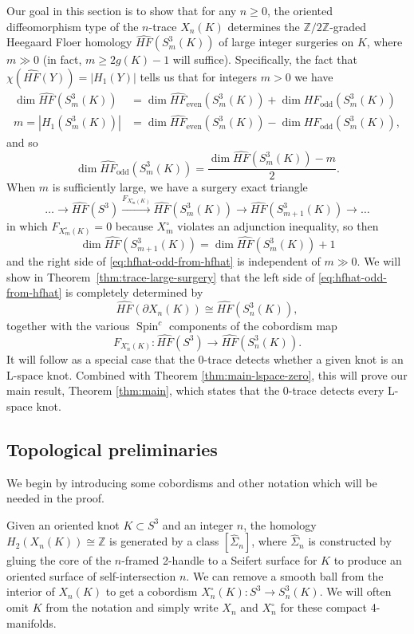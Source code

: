 \documentclass[11pt]{amsart}
\numberwithin{equation}{section}
\numberwithin{theorem}{section}
\theoremstyle{definition}
\newcommand{\Z}{\mathbb{Z}}
\newcommand{\spc}{\operatorname{Spin}^c}
\newcommand{\hfhat}{\widehat{\mathit{HF}}}
\newcommand{\godd}{\mathrm{odd}}
\newcommand{\geven}{\mathrm{even}}
\begin{document}
Our goal in this section is to show that for any $n \geq 0$, the oriented diffeomorphism type of the $n$-trace $X_n(K)$ determines the $\Z/2\Z$-graded Heegaard Floer homology $\hfhat(S^3_m(K))$ of large integer surgeries on $K$, where $m \gg 0$ (in fact, $m \geq 2g(K)-1$ will suffice).  Specifically, the fact that $\chi(\hfhat(Y)) = |H_1(Y)|$ tells us that for integers $m > 0$ we have
\begin{align*}
\dim \hfhat(S^3_m(K)) &= \dim \hfhat_\geven(S^3_m(K)) + \dim \hfhat_\godd(S^3_m(K)) \\
m = |H_1(S^3_m(K))| &= \dim \hfhat_\geven(S^3_m(K)) - \dim \hfhat_\godd(S^3_m(K)),
\end{align*}
and so
\begin{equation} \label{eq:hfhat-odd-from-hfhat}
\dim \hfhat_\godd(S^3_m(K)) = \frac{ \dim \hfhat(S^3_m(K)) - m }{2}.
\end{equation}
When $m$ is sufficiently large, we have a surgery exact triangle
\[ \dots \to \hfhat(S^3) \xrightarrow{F_{X^\circ_m(K)}} \hfhat(S^3_m(K)) \to \hfhat(S^3_{m+1}(K)) \to \dots \]
in which $F_{X^\circ_m(K)} = 0$ because $X^\circ_m$ violates an adjunction inequality, so then
\[ \dim \hfhat(S^3_{m+1}(K)) = \dim \hfhat(S^3_m(K)) + 1 \]
and the right side of \eqref{eq:hfhat-odd-from-hfhat} is independent of $m \gg 0$.  We will show in Theorem~\ref{thm:trace-large-surgery} that the left side of \eqref{eq:hfhat-odd-from-hfhat} is completely determined by \[\hfhat(\partial X_n(K)) \cong \hfhat(S^3_n(K)),\] together with the various $\spc$ components of the cobordism map
\[ F_{X^\circ_n(K)}: \hfhat(S^3) \to \hfhat(S^3_n(K)). \]
It  will follow as a special case that the $0$-trace detects whether a given knot is an L-space knot.   Combined with Theorem \ref{thm:main-lspace-zero}, this will prove our main result, Theorem \ref{thm:main}, which states that the $0$-trace detects every L-space knot.


\subsection{Topological preliminaries} \label{ssec:topology-setup}

We begin by introducing some cobordisms and other notation which will be needed in the proof.

Given an oriented knot $K \subset S^3$ and an integer $n$, the homology $H_2(X_n(K)) \cong \Z$ is generated by a class $[\hat\Sigma_n]$, where $\hat\Sigma_n$ is constructed by gluing the core of the $n$-framed 2-handle to a Seifert surface for $K$ to produce an oriented surface of self-intersection $n$.  We can remove a smooth ball from the interior of $X_n(K)$ to get a cobordism $X^\circ_n(K): S^3 \to S^3_n(K)$.  We will often omit $K$ from the notation and simply write $X_n$ and $X^\circ_n$ for these compact 4-manifolds.
\end{document}
